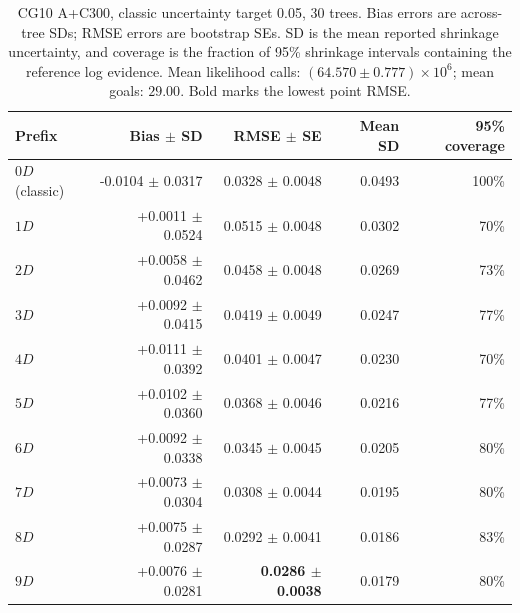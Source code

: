 \documentclass[pdflatex,sn-basic,icol]{sn-jnl}
\theoremstyle{plain}
\theoremstyle{definition}
\begin{document}
\begin{table}[t]
\centering
\scriptsize
\caption{CG10 A+C300, classic uncertainty target 0.05, 30 trees. Bias errors are across-tree SDs; RMSE errors are bootstrap SEs. SD is the mean reported shrinkage uncertainty, and coverage is the fraction of 95\% shrinkage intervals containing the reference log evidence. Mean likelihood calls: $(64.570\pm0.777)\times10^6$; mean goals: $29.00$. Bold marks the lowest point RMSE.}
\label{tab:phantom_evidence_cg10_0p05}
\begin{tabular}{lrrrr}
\toprule
Prefix & Bias $\pm$ SD & RMSE $\pm$ SE & Mean SD & 95\% coverage \\
\midrule
$0D$ (classic) & -0.0104 $\pm$ 0.0317 & 0.0328 $\pm$ 0.0048 & 0.0493 & 100\% \\
$1D$ & +0.0011 $\pm$ 0.0524 & 0.0515 $\pm$ 0.0048 & 0.0302 & 70\% \\
$2D$ & +0.0058 $\pm$ 0.0462 & 0.0458 $\pm$ 0.0048 & 0.0269 & 73\% \\
$3D$ & +0.0092 $\pm$ 0.0415 & 0.0419 $\pm$ 0.0049 & 0.0247 & 77\% \\
$4D$ & +0.0111 $\pm$ 0.0392 & 0.0401 $\pm$ 0.0047 & 0.0230 & 70\% \\
$5D$ & +0.0102 $\pm$ 0.0360 & 0.0368 $\pm$ 0.0046 & 0.0216 & 77\% \\
$6D$ & +0.0092 $\pm$ 0.0338 & 0.0345 $\pm$ 0.0045 & 0.0205 & 80\% \\
$7D$ & +0.0073 $\pm$ 0.0304 & 0.0308 $\pm$ 0.0044 & 0.0195 & 80\% \\
$8D$ & +0.0075 $\pm$ 0.0287 & 0.0292 $\pm$ 0.0041 & 0.0186 & 83\% \\
$9D$ & +0.0076 $\pm$ 0.0281 & \textbf{0.0286 $\pm$ 0.0038} & 0.0179 & 80\% \\
\bottomrule
\end{tabular}
\end{table}
\end{document}
